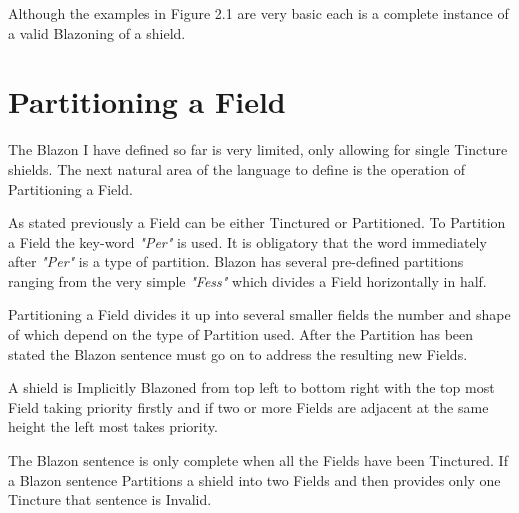 Although the examples in Figure 2.1 are very basic each is a complete instance of a valid Blazoning of a shield.

\section{Partitioning a Field}
The Blazon I have defined so far is very limited, only allowing for single Tincture shields.  The next natural area of the language to define is the operation of Partitioning a Field.  

As stated previously a Field can be either Tinctured or Partitioned.  To Partition a Field the key-word \emph{"Per"} is used. It is obligatory that the word immediately after \emph{"Per"} is a type of partition.  Blazon has several pre-defined partitions ranging from the very simple \emph{"Fess"} which divides a Field horizontally in half. 

Partitioning a Field divides it up into several smaller fields the number and shape of which depend on the type of Partition used.  After the Partition has been stated the Blazon sentence must go on to address the resulting new Fields. 

A shield is Implicitly Blazoned from top left to bottom right with the top most Field taking priority firstly and if two or more Fields are adjacent at the same height the left most takes priority.  

The Blazon sentence is only complete when all the Fields have been Tinctured.  If a Blazon sentence Partitions a shield into two Fields and then provides only one Tincture that sentence is Invalid.  




